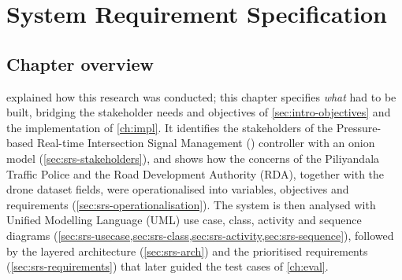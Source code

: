 
\chapter{System Requirement Specification}\label{ch:srs}

\section{Chapter overview}\label{sec:srs-overview}

 explained how this research was conducted; this chapter specifies \emph{what} had to be built, bridging the stakeholder needs and objectives of \cref{sec:intro-objectives} and the implementation of \cref{ch:impl}. It identifies the stakeholders of the Pressure-based Real-time Intersection Signal Management (\prism{}) controller with an onion model (\cref{sec:srs-stakeholders}), and shows how the concerns of the Piliyandala Traffic Police and the Road Development Authority (RDA), together with the drone dataset fields, were operationalised into variables, objectives and requirements (\cref{sec:srs-operationalisation}). The system is then analysed with Unified Modelling Language (UML) use case, class, activity and sequence diagrams (\cref{sec:srs-usecase,sec:srs-class,sec:srs-activity,sec:srs-sequence}), followed by the layered architecture (\cref{sec:srs-arch}) and the prioritised requirements (\cref{sec:srs-requirements}) that later guided the test cases of \cref{ch:eval}.

